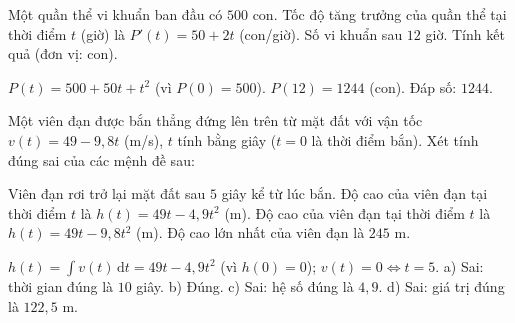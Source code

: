 \begin{vidu}
Một quần thể vi khuẩn ban đầu có $500$ con. Tốc độ tăng trưởng của quần thể tại thời điểm $t$ (giờ) là $P'(t)=50+2t$ (con/giờ). Số vi khuẩn sau $12$ giờ. Tính kết quả (đơn vị: con).
\begin{loigiai}
\giai $P(t)=500+50t+t^2$ (vì $P(0)=500$). $P(12)=1244$ (con). Đáp số: $1244$.
\end{loigiai}
\end{vidu}
\begin{viduds}
Một viên đạn được bắn thẳng đứng lên trên từ mặt đất với vận tốc $v(t)=49-9{,}8t$ (m/s), $t$ tính bằng giây ($t=0$ là thời điểm bắn). Xét tính đúng sai của các mệnh đề sau:

\begin{dungsai}
  \y Viên đạn rơi trở lại mặt đất sau $5$ giây kể từ lúc bắn. \oDS
  \y Độ cao của viên đạn tại thời điểm $t$ là $h(t)=49t-4{,}9t^2$ (m). \oDS
  \y Độ cao của viên đạn tại thời điểm $t$ là $h(t)=49t-9{,}8t^2$ (m). \oDS
  \y Độ cao lớn nhất của viên đạn là $245$ m. \oDS
\end{dungsai}
\begin{loigiai}
\giai $h(t)=\displaystyle\int v(t)\,\mathrm{d}t=49t-4{,}9t^2$ (vì $h(0)=0$); $v(t)=0\Leftrightarrow t=5$. a) Sai: thời gian đúng là $10$ giây. b) Đúng. c) Sai: hệ số đúng là $4{,}9$. d) Sai: giá trị đúng là $122{,}5$ m.
\end{loigiai}
\end{viduds}

